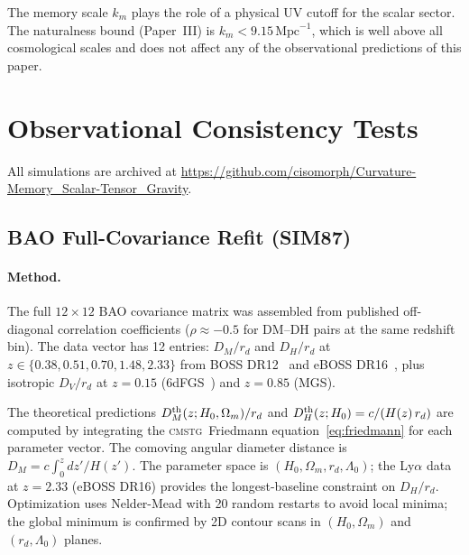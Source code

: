 \documentclass[12pt,a4paper]{article}
\newcommand{\CMSTG}{\textsc{cmstg}}
\newcommand{\Lz}{\Lambda_0}
\begin{document}
The memory scale $k_m$ plays the role of a physical UV cutoff for the scalar
sector. The naturalness bound (Paper~III) is $k_m < 9.15\,\mathrm{Mpc}^{-1}$,
which is well above all cosmological scales and does not affect any of the
observational predictions of this paper.

\section{Observational Consistency Tests}
\label{sec:observations}

All simulations are archived at
\url{https://github.com/cisomorph/Curvature-Memory_Scalar-Tensor_Gravity}.

\subsection{BAO Full-Covariance Refit (SIM87)}
\label{sec:bao}

\paragraph{Method.} The full $12\times12$ BAO covariance matrix was assembled
from published off-diagonal correlation coefficients ($\rho \approx -0.5$
for DM--DH pairs at the same redshift bin). The data vector has 12 entries:
$D_M/r_d$ and $D_H/r_d$ at $z \in \{0.38, 0.51, 0.70, 1.48, 2.33\}$ from
BOSS DR12~\cite{Alam2017} and eBOSS DR16~\cite{Alam2021}, plus isotropic
$D_V/r_d$ at $z = 0.15$ (6dFGS~\cite{Beutler2011}) and $z = 0.85$ (MGS).

The theoretical predictions $D_M^{\rm th}(z; H_0, \Omega_m)/r_d$ and
$D_H^{\rm th}(z; H_0) = c/(H(z)\,r_d)$ are computed by integrating the
\CMSTG\ Friedmann equation~\eqref{eq:friedmann} for each parameter vector.
The comoving angular diameter distance is $D_M = c\int_0^z dz'/H(z')$.
The parameter space is $(H_0, \Omega_m, r_d, \Lz)$; the Ly$\alpha$ data
at $z = 2.33$ (eBOSS DR16) provides the longest-baseline constraint
on $D_H/r_d$. Optimization uses Nelder-Mead with 20 random restarts to
avoid local minima; the global minimum is confirmed by 2D contour scans
in $(H_0, \Omega_m)$ and $(r_d, \Lz)$ planes.
\end{document}
